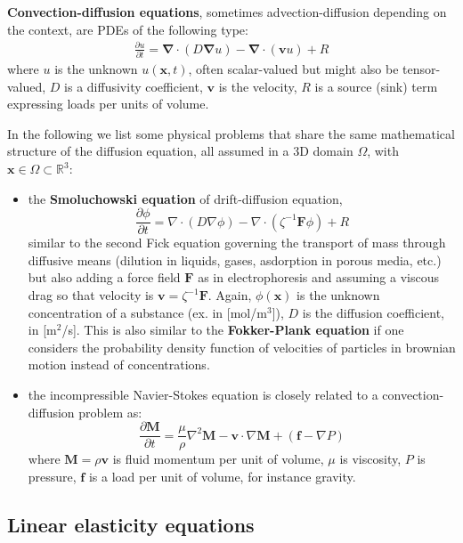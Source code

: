 \documentclass{digitaldynamics}
\def\vect#1{\bm{#1}}
\begin{document}
\textbf{Convection-diffusion equations}, sometimes advection-diffusion depending on the context, are PDEs of the following type:
\begin{align}
\frac{\partial u}{\partial t}  = \mathbf{\nabla} \cdot (D \mathbf{\nabla} u) - \mathbf{\nabla} \cdot (\vect{v} u) + R
\end{align}
where $u$ is the unknown $u(\vect{x},t)$, often scalar-valued but might also be tensor-valued,
$D$ is a diffusivity coefficient, 
$\vect{v}$ is the velocity, 
$R$ is a source (sink) term expressing loads per units of volume.

In the following we list some physical problems that share the same mathematical structure of the diffusion equation, 
all assumed in a 3D domain $\Omega$, with $\vect{x} \in \Omega \subset \mathbb{R}^3$:

\begin{itemize}

\item the \textbf{Smoluchowski equation} of drift-diffusion equation, 
\[
\frac{\partial \phi}{\partial t}  = \nabla \cdot (D \nabla \phi) - \nabla \cdot \left( \zeta^{-1} \vect{F} \phi \right) + R
\]
similar to the second Fick equation governing the transport of mass through diffusive means (dilution in liquids, gases, asdorption in porous media, etc.) but also adding a force field $\vect{F}$ as in electrophoresis and assuming a viscous drag so that velocity is $\vect{v}=\zeta^{-1} \vect{F}$. Again, $\phi(\vect{x})$ is the unknown concentration of a substance (ex. in [mol/m${}^3$]), $D$ is the diffusion coefficient, in [m${}^2$/s]. 
This is also similar to the \textbf{Fokker-Plank equation} if one considers the probability density function of velocities of particles in brownian motion instead of concentrations.

\item the incompressible Navier-Stokes equation is closely related to a convection-diffusion problem as:
\[
\frac{\partial \vect{M}}{\partial t} = \frac{\mu}{\rho} \nabla^2 \vect{M} -\vect{v} \cdot \nabla \vect{M} + (\vect{f}-\nabla P)
\]
where $\vect{M} = \rho \vect{v}$ is fluid momentum per unit of volume, $\mu$ is viscosity, $P$ is pressure, $\vect{f}$ is a load per unit of volume, for instance gravity.

\end{itemize}






\subsection{Linear elasticity equations}
\end{document}
